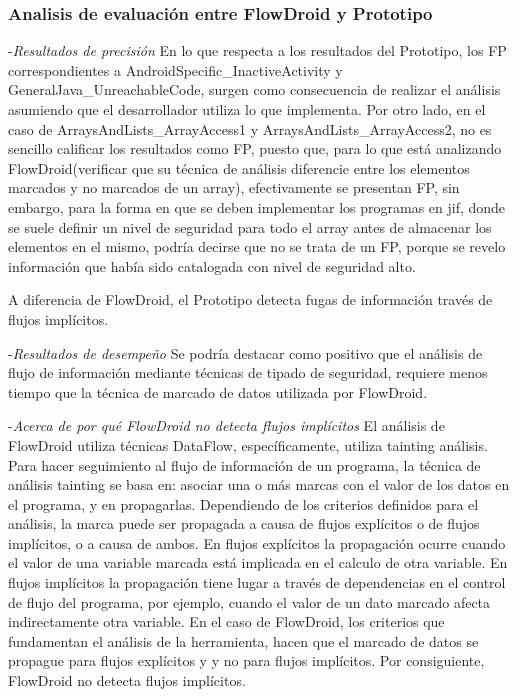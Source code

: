 \subsubsection{Analisis de evaluación entre FlowDroid y Prototipo}
-\textit{Resultados de precisión}\newline
En lo que respecta a los resultados del Prototipo, los FP correspondientes a
AndroidSpecific\_InactiveActivity y GeneralJava\_UnreachableCode, surgen como
consecuencia de realizar el análisis asumiendo que el desarrollador utiliza lo
que implementa.\newline 
Por otro lado, en el caso de ArraysAndLists\_ArrayAccess1 y
ArraysAndLists\_ArrayAccess2, no es sencillo calificar los resultados como FP,
puesto que, para lo que está analizando FlowDroid(verificar que su técnica de
análisis diferencie entre los elementos marcados y no marcados de un array),
efectivamente se presentan FP, sin embargo, para la forma en que se deben
implementar los programas en jif, donde se suele definir un nivel de seguridad
para todo el array antes de almacenar los elementos en el mismo, podría decirse
que no se trata de un FP, porque se revelo información que había sido
catalogada con nivel de seguridad alto.

A diferencia de FlowDroid, el Prototipo detecta fugas de información través de
flujos implícitos.

-\textit{Resultados de desempeño}\newline
Se podría destacar como positivo que el análisis de flujo de información
mediante técnicas de tipado de seguridad, requiere menos tiempo que la técnica
de marcado de datos utilizada por FlowDroid.

-\textit{Acerca de por qué FlowDroid no detecta flujos implícitos}\newline
El análisis de FlowDroid utiliza técnicas DataFlow, específicamente, utiliza
tainting análisis. Para hacer seguimiento al flujo de información de un
programa, la técnica de análisis tainting se basa en: asociar una o más marcas
con el valor de los datos en el programa, y en propagarlas. Dependiendo de los
criterios definidos para el análisis, la marca puede ser propagada a causa de
flujos explícitos o de flujos implícitos, o a causa de ambos. En flujos
explícitos la propagación ocurre cuando el valor de una variable marcada está
implicada en el calculo de otra variable. En flujos implícitos la propagación
tiene lugar a través de dependencias en el control de flujo del programa, por
ejemplo, cuando el valor de un dato marcado afecta indirectamente otra variable.\newline 
En el caso de FlowDroid, los criterios que fundamentan el análisis de la
herramienta, hacen que el marcado de datos se propague para flujos explícitos y
y no para flujos implícitos. Por consiguiente, FlowDroid no detecta flujos
implícitos.

